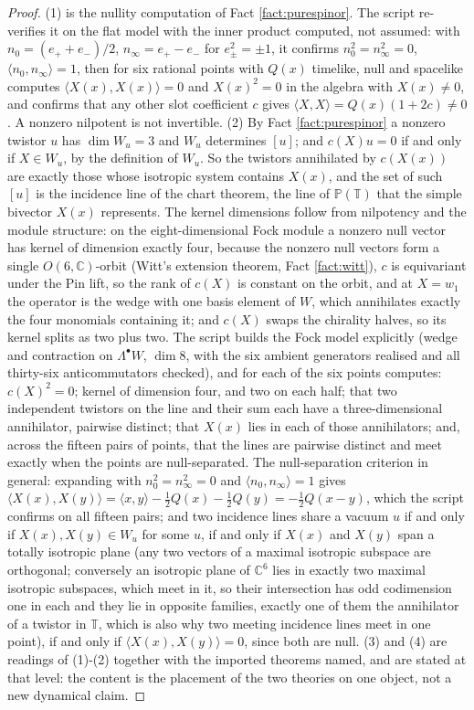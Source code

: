 \documentclass[11pt]{article}
\theoremstyle{definition}
\newcommand{\C}{\mathbb{C}}
\newcommand{\T}{\mathbb{T}}
\newcommand{\ip}[2]{\langle #1, #2\rangle}
\begin{document}
\begin{proof}
(1) is the nullity computation of Fact \ref{fact:purespinor}. The script re-verifies it on the flat model with the inner product computed, not assumed: with $n_{0} = (e_{+} + e_{-})/2$, $n_{\infty} = e_{+} - e_{-}$ for $e_{\pm}^{2} = \pm 1$, it confirms $n_{0}^{2} = n_{\infty}^{2} = 0$, $\ip{n_{0}}{n_{\infty}} = 1$, then for six rational points with $Q(x)$ timelike, null and spacelike computes $\ip{X(x)}{X(x)} = 0$ and $X(x)^{2} = 0$ in the algebra with $X(x) \neq 0$, and confirms that any other slot coefficient $c$ gives $\ip{X}{X} = Q(x)(1 + 2c) \neq 0$. A nonzero nilpotent is not invertible. (2) By Fact \ref{fact:purespinor} a nonzero twistor $u$ has $\dim W_{u} = 3$ and $W_{u}$ determines $[u]$; and $c(X)u = 0$ if and only if $X \in W_{u}$, by the definition of $W_{u}$. So the twistors annihilated by $c(X(x))$ are exactly those whose isotropic system contains $X(x)$, and the set of such $[u]$ is the incidence line of the chart theorem, the line of $\mathbb{P}(\T)$ that the simple bivector $X(x)$ represents. The kernel dimensions follow from nilpotency and the module structure: on the eight-dimensional Fock module a nonzero null vector has kernel of dimension exactly four, because the nonzero null vectors form a single $O(6,\C)$-orbit (Witt's extension theorem, Fact \ref{fact:witt}), $c$ is equivariant under the Pin lift, so the rank of $c(X)$ is constant on the orbit, and at $X = w_{1}$ the operator is the wedge with one basis element of $W$, which annihilates exactly the four monomials containing it; and $c(X)$ swaps the chirality halves, so its kernel splits as two plus two. The script builds the Fock model explicitly (wedge and contraction on $\Lambda^{\bullet}W$, $\dim 8$, with the six ambient generators realised and all thirty-six anticommutators checked), and for each of the six points computes: $c(X)^{2} = 0$; kernel of dimension four, and two on each half; that two independent twistors on the line and their sum each have a three-dimensional annihilator, pairwise distinct; that $X(x)$ lies in each of those annihilators; and, across the fifteen pairs of points, that the lines are pairwise distinct and meet exactly when the points are null-separated. The null-separation criterion in general: expanding with $n_{0}^{2} = n_{\infty}^{2} = 0$ and $\ip{n_{0}}{n_{\infty}} = 1$ gives $\ip{X(x)}{X(y)} = \ip{x}{y} - \tfrac12 Q(x) - \tfrac12 Q(y) = -\tfrac12 Q(x-y)$, which the script confirms on all fifteen pairs; and two incidence lines share a vacuum $u$ if and only if $X(x), X(y) \in W_{u}$ for some $u$, if and only if $X(x)$ and $X(y)$ span a totally isotropic plane (any two vectors of a maximal isotropic subspace are orthogonal; conversely an isotropic plane of $\C^{6}$ lies in exactly two maximal isotropic subspaces, which meet in it, so their intersection has odd codimension one in each and they lie in opposite families, exactly one of them the annihilator of a twistor in $\T$, which is also why two meeting incidence lines meet in one point), if and only if $\ip{X(x)}{X(y)} = 0$, since both are null. (3) and (4) are readings of (1)-(2) together with the imported theorems named, and are stated at that level: the content is the placement of the two theories on one object, not a new dynamical claim.

\end{proof}
\end{document}
